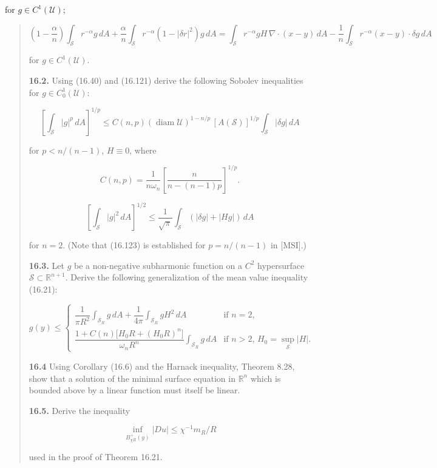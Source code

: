 for $g\in C^1(\mathcal U)$;



\begin{quote}
\setcounter{equation}{122}
\begin{equation}\tag{16.122}
\left(1-\frac{\alpha}{n}\right)\int_{\mathcal S} r^{-\alpha}g\,dA+\frac{\alpha}{n}\int_{\mathcal S}r^{-\alpha}(1-|\delta r|^2)g\,dA
=\int_{\mathcal S}r^{-\alpha}gH\,\nabla\!\cdot(x-y)\,dA-\frac{1}{n}\int_{\mathcal S}r^{-\alpha}(x-y)\cdot\delta g\,dA
\end{equation}

for $g\in C^1(\mathcal U)$.

\medskip

\textbf{16.2.} Using (16.40) and (16.121) derive the following Sobolev inequalities for
$g\in C_0^1(\mathcal U)$:

\begin{equation}\tag{16.123}
\left[\int_{\mathcal S}|g|^p\,dA\right]^{1/p}\le C(n,p)(\operatorname{diam}\mathcal U)^{1-n/p}\,[A(\mathcal S)]^{1/p}\int_{\mathcal S}|\delta g|\,dA
\end{equation}

for $p<n/(n-1)$, $H\equiv0$, where

\[
C(n,p)=\frac{1}{n\omega_n}\left[\frac{n}{n-(n-1)p}\right]^{1/p}.
\]

\begin{equation}\tag{16.124}
\left[\int_{\mathcal S}|g|^2\,dA\right]^{1/2}\le \frac{1}{\sqrt{\pi}}\int_{\mathcal S}(|\delta g|+|Hg|)\,dA
\end{equation}

for $n=2$. (Note that (16.123) is established for $p=n/(n-1)$ in [MSI].)

\medskip

\textbf{16.3.} Let $g$ be a non-negative subharmonic function on a $C^2$ hypersurface
$\mathcal S\subset\mathbb R^{n+1}$. Derive the following generalization of the mean value inequality (16.21):

\[
g(y)\le
\begin{cases}
\dfrac{1}{\pi R^2}\int_{\mathcal S_R}g\,dA+\dfrac{1}{4\pi}\int_{\mathcal S_R}gH^2\,dA & \text{if } n=2,\\[1.2em]
\dfrac{1+C(n)\bigl[H_0R+(H_0R)^n\bigr]}{\omega_n R^n}\int_{\mathcal S_R}g\,dA & \text{if } n>2,\, H_0=\sup_{\mathcal S}|H|.
\end{cases}
\]

\medskip

\textbf{16.4} Using Corollary (16.6) and the Harnack inequality, Theorem 8.28, show
that a solution of the minimal surface equation in $\mathbb R^n$ which is bounded above by a
linear function must itself be linear.

\medskip

\textbf{16.5.} Derive the inequality

\[
\inf_{B^{+}_{\chi R}(y)}|Du|\le \chi^{-1}m_R/R
\]

used in the proof of Theorem 16.21.
\end{quote}

